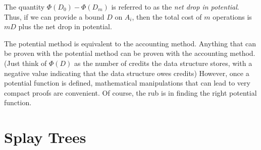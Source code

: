 The quantity $\Phi(D_0) - \Phi(D_m)$ is referred to as the \emph{net
drop in potential}.  Thus, if we can provide a bound $D$ on $A_i$,
then the total cost of $m$ operations is $mD$ plus the net drop in
potential.  

The potential method is equivalent to the accounting method.  Anything
that can be proven with the potential method can be proven with the
accounting method. (Just think of $\Phi(D)$ as the number of credits
the data structure stores, with a negative value indicating that the
data structure owes credits) However, once a potential function is
defined, mathematical manipulations that can lead to very compact
proofs are convenient.  Of course, the rub is in finding the right
potential function.

\section{Splay Trees}

